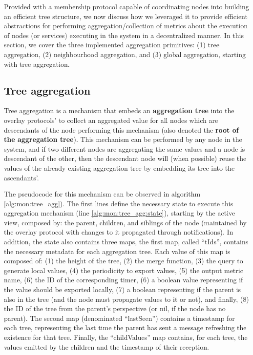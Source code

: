 
Provided with a membership protocol capable of coordinating nodes into building an efficient tree structure, we now discuss how we leveraged it to provide efficient abstractions for performing aggregation/collection of metrics about the execution of nodes (or services) executing in the system in a decentralized manner. In this section, we cover the three implemented aggregation primitives: (1) tree aggregation, (2) neighbourhood aggregation, and (3) global aggregation, starting with tree aggregation.

\subsection{Tree aggregation} \label{sec:mon_protocol:tree_agg}

Tree aggregation is a mechanism that embeds an \textbf{aggregation tree} into the overlay protocols' to collect an aggregated value for all nodes which are descendants of the node performing this mechanism (also denoted the \textbf{root of the aggregation tree}). This mechanism can be performed by any node in the system, and if two different nodes are aggregating the same values and a node is descendant of the other, then the descendant node will (when possible) reuse the values of the already existing aggregation tree by embedding its tree into the ascendants'.

The pseudocode for this mechanism can be observed in algorithm \ref{alg:mon:tree_agg}). The first lines define the necessary state to execute this aggregation mechanism (line \ref{alg:mon:tree_agg:state}), starting by the active view, composed by: the parent, children, and siblings of the node (maintained by the overlay protocol with changes to it propagated through notifications). In addition, the state also contains three maps, the first map, called ``tIds'', contains the necessary metadata for each aggregation tree. Each value of this map is composed of: (1) the height of the tree, (2) the merge function, (3) the query to generate local values, (4) the periodicity to export values, (5) the output metric name, (6) the ID of the corresponding timer, (6) a boolean value representing if the value should be exported locally, (7) a boolean representing if the parent is also in the tree (and the node must propagate values to it or not), and finally, (8) the ID of the tree from the parent's perspective (or nil, if the node has no parent). The second map (denominated ``lastSeen'') contains a timestamp for each tree, representing the last time the parent has sent a message refreshing the existence for that tree. Finally, the ``childValues'' map contains, for each tree, the values emitted by the children and the timestamp of their reception.

